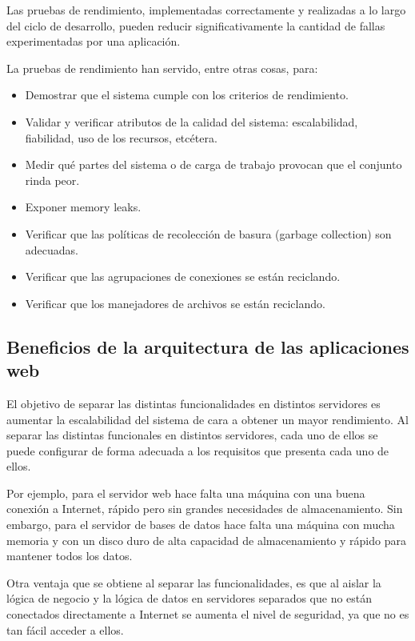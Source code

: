 Las pruebas de rendimiento, implementadas correctamente y realizadas a lo largo del ciclo de desarrollo, pueden reducir significativamente la cantidad de fallas experimentadas por una aplicación.

La pruebas de rendimiento han servido, entre otras cosas, para:

\begin{itemize}
  \item Demostrar que el sistema cumple con los criterios de rendimiento.
  \item Validar y verificar atributos de la calidad del sistema: escalabilidad, fiabilidad, uso de los recursos, etcétera.
  \item Medir qué partes del sistema o de carga de trabajo provocan que el conjunto rinda peor.
  \item Exponer memory leaks.
  \item Verificar que las políticas de recolección de basura (garbage collection) son adecuadas.
  \item Verificar que las agrupaciones de conexiones se están reciclando.
  \item Verificar que los manejadores de archivos se están reciclando.
\end{itemize}

\subsection{Beneficios de la arquitectura de las aplicaciones web}

El objetivo de separar las distintas funcionalidades en distintos servidores es aumentar la escalabilidad del sistema de cara a obtener un mayor rendimiento. Al separar las distintas funcionales en distintos servidores, cada uno de ellos se puede configurar de forma adecuada a los requisitos que presenta cada uno de ellos.

Por ejemplo, para el servidor web hace falta una máquina con una buena conexión a Internet, rápido pero sin grandes necesidades de almacenamiento. Sin embargo, para el servidor de bases de datos hace falta una máquina con mucha memoria y con un disco duro de alta capacidad de almacenamiento y rápido para mantener todos los datos.

Otra ventaja que se obtiene al separar las funcionalidades, es que al aislar la lógica de negocio y la lógica de datos en servidores separados que no están conectados directamente a Internet se aumenta el nivel de seguridad, ya que no es tan fácil acceder a ellos.

